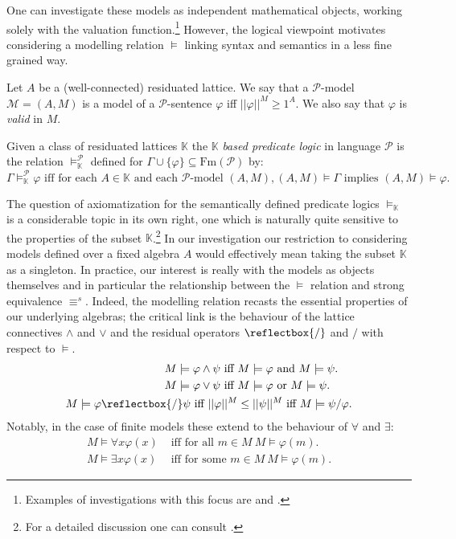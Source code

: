 \documentclass{lmcs} %
\newcommand{\?}{\ensuremath{\mkern0.4\thinmuskip}}
\newcommand{\und}{\mathord{\reflectbox{/}}}%
\let\phi=\varphi
\newcommand{\CM}{\mathcal{M}}
\newcommand{\CP}{\mathcal{P}}
\begin{document}
One can investigate these models as independent mathematical objects, working solely with the valuation function.\footnote{Examples of investigations with this focus are \cite{BiziereGradelNaaf23:Localitysemiring} and \cite{HorcikMoraschiniVidal17:Algconstraintsat}.} However, the logical viewpoint motivates considering a modelling relation $\models$ linking syntax and semantics in a less fine grained way. 

\begin{defi}
    Let $A$ be a (well-connected) residuated lattice. We say that a $\CP$-model $\CM=(A,M)$ is a model of a $\CP$-sentence $\phi$ iff $||\phi||^M\geq 1^A$. We also say that $\phi$ is \textit{valid} in $M$. 

    Given a class of residuated lattices $\mathbb{K}$ the $\mathbb{K}$ \textit{based predicate logic} in language $\CP$ is the relation $\models^{\CP}_{\mathbb{K}}$ defined for $\Gamma\cup\{\phi\}\subseteq \mathrm{Fm}(\CP)$ by:\[\Gamma\models^{\CP}_{\mathbb{K}}\phi\text{ iff for each }A\in\mathbb{K}\text{ and each }\CP\text{-model }(A,M), (A,M)\models\Gamma\text{ implies }(A,M)\models \phi.\]
\end{defi}
\noindent
The question of axiomatization for the semantically defined predicate logics $\models_{\mathbb{K}}$ is a considerable topic in its own right, one which is naturally quite sensitive to the properties of the subset $\mathbb{K}$.\footnote{For a detailed discussion one can consult \cite[Chapter 7]{CintulaNoguera21:LogicImplication}.} In our investigation our restriction to considering models defined over a fixed algebra $A$ would effectively mean taking the subset $\mathbb{K}$ as a singleton. In practice, our interest is really with the models as objects themselves and in particular the relationship between the $\models$ relation and strong equivalence $\equiv^s$. Indeed, the modelling relation recasts the essential properties of our underlying algebras; the critical link is the behaviour of the lattice connectives $\land$ and $\lor$ and the residual operators $\und$ and $/$ with respect to $\models$. \begin{align*}
    M\models\phi\land\psi \text{ iff }&M\models\phi \text{ and } M\models\psi.\\
    M\models\phi\lor\psi \text{ iff }&M\models\phi\text{ or }M\models\psi.\\
    M\models\phi\und\psi \text{ iff }||\phi||^M&\leq ||\psi||^M \text{ iff }M\models\psi/\phi. 
\end{align*}
Notably, in the case of finite models these extend to the behaviour of $\forall$ and $\exists$:\begin{align*}
    M\models \forall x\phi(x)&\text{ iff for all }m\in M\ M\models\phi(m).\\
    M \models\exists x\phi(x)&\text{ iff for some }m\in M\ M\models\phi(m).
\end{align*}
\end{document}
